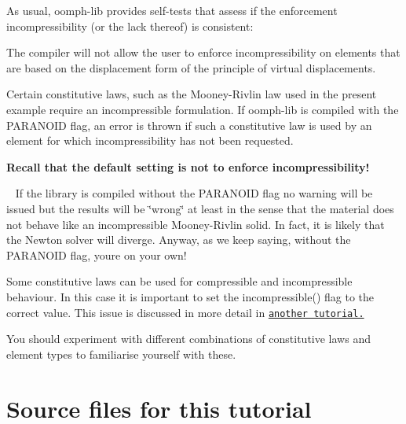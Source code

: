 As usual, {\ttfamily oomph-\/lib} provides self-\/tests that assess if the enforcement incompressibility (or the lack thereof) is consistent\+:
\begin{DoxyItemize}
\item The compiler will not allow the user to enforce incompressibility on elements that are based on the displacement form of the principle of virtual displacements. ~\newline
~\newline

\item Certain constitutive laws, such as the Mooney-\/\+Rivlin law used in the present example require an incompressible formulation. If {\ttfamily oomph-\/lib} is compiled with the {\ttfamily P\+A\+R\+A\+N\+O\+ID} flag, an error is thrown if such a constitutive law is used by an element for which incompressibility has not been requested. ~\newline
~\newline
 \begin{center} {\bfseries Recall that the default setting is not to enforce incompressibility!} \end{center}  ~\newline
 If the library is compiled without the {\ttfamily P\+A\+R\+A\+N\+O\+ID} flag no warning will be issued but the results will be \char`\"{}wrong\char`\"{} at least in the sense that the material does not behave like an incompressible Mooney-\/\+Rivlin solid. In fact, it is likely that the Newton solver will diverge. Anyway, as we keep saying, without the {\ttfamily P\+A\+R\+A\+N\+O\+ID} flag, you\textquotesingle{}re on your own! ~\newline
~\newline

\item Some constitutive laws can be used for compressible and incompressible behaviour. In this case it is important to set the {\ttfamily incompressible()} flag to the correct value. This issue is discussed in more detail in \href{../../compressed_square/html/index.html}{\tt another tutorial.}
\end{DoxyItemize}You should experiment with different combinations of constitutive laws and element types to familiarise yourself with these.



 

\hypertarget{index_sources}{}\section{Source files for this tutorial}\label{index_sources}

